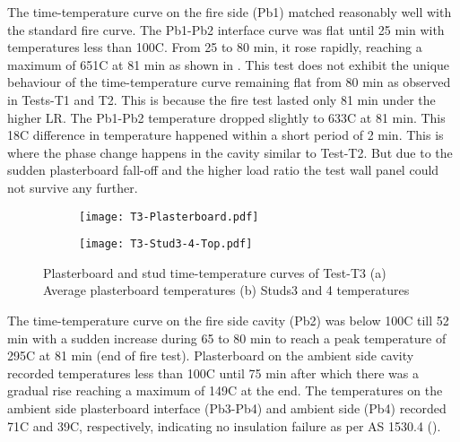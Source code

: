 The time-temperature curve on the fire side (Pb1) matched reasonably well with the standard fire curve. The Pb1-Pb2 interface curve was flat until 25 min with temperatures less than 100\degree C. From 25 to 80 min, it rose rapidly, reaching a maximum of 651\degree C at 81 min as shown in . This test does not exhibit the unique behaviour of the time-temperature curve remaining flat from 80 min as observed in Tests-T1 and T2. This is because the fire test lasted only 81 min under the higher LR. The Pb1-Pb2 temperature dropped slightly to 633\degree C at 81 min. This 18\degree C difference in temperature happened within a short period of 2 min. This is where the phase change happens in the cavity similar to Test-T2. But due to the sudden plasterboard fall-off and the higher load ratio the test wall panel could not survive any further.
\begin{figure}[!htbp]
	\centering
	\begin{subfigure}[b]{0.7\textwidth}
		\centering
		\texttt{[image: T3-Plasterboard.pdf]}
		\caption{}
		\label{subfig:T3-Plasterboard}
	\end{subfigure}
	\begin{subfigure}[b]{0.7\textwidth}
		\centering
		\texttt{[image: T3-Stud3-4-Top.pdf]}
		\caption{}
		\label{subfig:T3-Stud3-4-Top}
	\end{subfigure}
	   \caption{Plasterboard and stud time-temperature curves of Test-T3 (a) Average plasterboard temperatures (b) Studs3 and 4 temperatures}
	   \label{fig:T3-PB-Stud}
\end{figure}

The time-temperature curve on the fire side cavity (Pb2) was below 100\degree C till 52 min with a sudden increase during 65 to 80 min to reach a peak temperature of 295\degree C at 81 min (end of fire test). Plasterboard on the ambient side cavity recorded temperatures less than 100\degree C until 75 min after which there was a gradual rise reaching a maximum of 149\degree C at the end. The temperatures on the ambient side plasterboard interface (Pb3-Pb4) and ambient side (Pb4) recorded 71\degree C and 39\degree C, respectively, indicating no insulation failure as per AS 1530.4 (\citet{StandardsAustral2014}).

